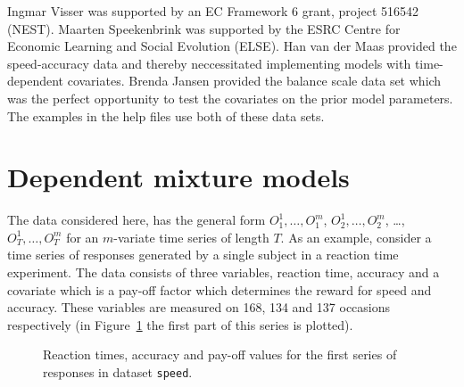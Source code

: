 \documentclass[a4paper]{article}
\begin{document}
Ingmar Visser was supported by an EC Framework 6 grant, project 516542
(NEST).  Maarten Speekenbrink was supported by the ESRC Centre for
Economic Learning and Social Evolution (ELSE).  Han van der Maas
provided the speed-accuracy data \cite{Maas2005b} and thereby
neccessitated implementing models with time-dependent covariates.
Brenda Jansen provided the balance scale data set \citep{Jansen2001}
which was the perfect opportunity to test the covariates on the prior
model parameters.  The examples in the help files use both of these
data sets.


\section{Dependent mixture models}



The data considered here, has the general form $O_{1}^{1}, \ldots,
O_{1}^{m}$, $O_{2}^{1}, \ldots, O_{2}^{m}$, \ldots, $O_{T}^{1}, \ldots,
O_{T}^{m}$ for an $m$-variate time series of length $T$.  As an
example, consider a time series of responses generated by a single
subject in a reaction time experiment.  The data consists of three
variables, reaction time, accuracy and a covariate which is a pay-off
factor which determines the reward for speed and accuracy.  These
variables are measured on 168, 134 and 137 occasions respectively 
(in Figure~\ref{fig:speed} the first part of this series is plotted).

\begin{figure}[htbp]
  \begin{center}
	  \caption{Reaction times, accuracy and pay-off values for
	  the first series of responses in dataset \texttt{speed}.}
	  \label{fig:speed}
  \end{center}
\end{figure}
\end{document}
